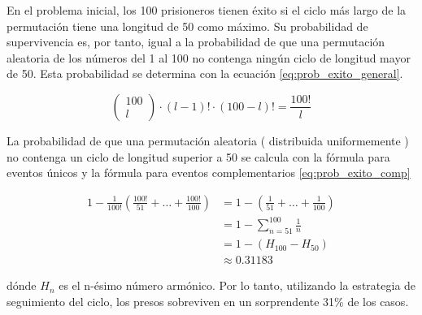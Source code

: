 En el problema inicial, los 100 prisioneros tienen éxito si el ciclo más largo de la permutación tiene una longitud de 50 como máximo. Su probabilidad de supervivencia es, por tanto, igual a la probabilidad de que una permutación aleatoria de los números del 1 al 100 no contenga ningún ciclo de longitud mayor de 50. Esta probabilidad se determina con la ecuación \ref{eq:prob_exito_general}.

\begin{equation}
   \begin{pmatrix}
    100\\ 
    l
    \end{pmatrix}
\cdot(l-1)!\cdot(100-l)!=\frac{100!}{l}
\label{eq:prob_exito_general}
\end{equation}


La probabilidad de que una permutación aleatoria ( distribuida uniformemente ) no contenga un ciclo de longitud superior a 50 se calcula con la fórmula para eventos únicos y la fórmula para eventos complementarios \ref{eq:prob_exito_comp}

\begin{equation}\label{eq:prob_exito_comp}
    \begin{split}
        1-\frac{1}{100!}\left(\frac{100!}{51}+\dots+\frac{100!}{100}\right)&=1-\left(\frac{1}{51}+\dots+\frac{1}{100}\right) \\
        &=1-\sum_{n=51}^{100} \frac{1}{n} \\
        &=1-(H_{100}-H_{50}) \\
        &\approx 0.31183
    \end{split}
\end{equation}

dónde $H_n$ es el n-ésimo número armónico. Por lo tanto, utilizando la estrategia de seguimiento del ciclo, los presos sobreviven en un sorprendente 31\% de los casos.